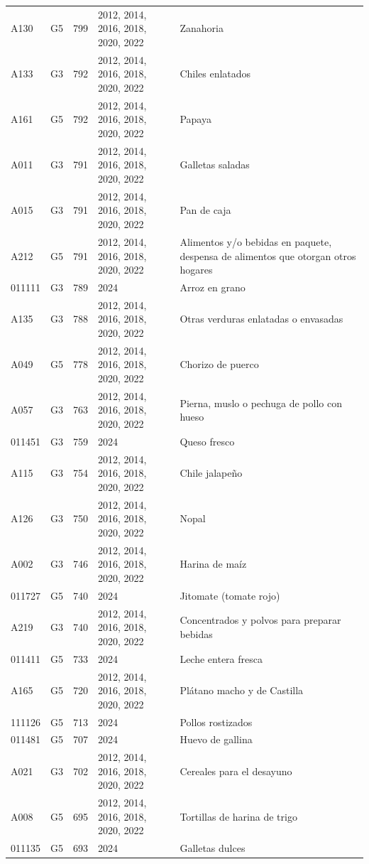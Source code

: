 \begin{table}[ht]
\begin{tabular}{llrll}
  A130 & G5 & 799 & 2012, 2014, 2016, 2018, 2020, 2022 & Zanahoria \\ 
  A133 & G3 & 792 & 2012, 2014, 2016, 2018, 2020, 2022 & Chiles enlatados \\ 
  A161 & G5 & 792 & 2012, 2014, 2016, 2018, 2020, 2022 & Papaya \\ 
  A011 & G3 & 791 & 2012, 2014, 2016, 2018, 2020, 2022 & Galletas saladas \\ 
  A015 & G3 & 791 & 2012, 2014, 2016, 2018, 2020, 2022 & Pan de caja \\ 
  A212 & G5 & 791 & 2012, 2014, 2016, 2018, 2020, 2022 & Alimentos y/o bebidas en paquete, despensa de alimentos que otorgan otros hogares \\ 
  011111 & G3 & 789 & 2024 & Arroz en grano \\ 
  A135 & G3 & 788 & 2012, 2014, 2016, 2018, 2020, 2022 & Otras verduras enlatadas o envasadas \\ 
  A049 & G5 & 778 & 2012, 2014, 2016, 2018, 2020, 2022 & Chorizo de puerco \\ 
  A057 & G3 & 763 & 2012, 2014, 2016, 2018, 2020, 2022 & Pierna, muslo o pechuga de pollo con hueso \\ 
  011451 & G3 & 759 & 2024 & Queso fresco \\ 
  A115 & G3 & 754 & 2012, 2014, 2016, 2018, 2020, 2022 & Chile jalapeño \\ 
  A126 & G3 & 750 & 2012, 2014, 2016, 2018, 2020, 2022 & Nopal \\ 
  A002 & G3 & 746 & 2012, 2014, 2016, 2018, 2020, 2022 & Harina de maíz \\ 
  011727 & G5 & 740 & 2024 & Jitomate (tomate rojo) \\ 
  A219 & G3 & 740 & 2012, 2014, 2016, 2018, 2020, 2022 & Concentrados y polvos para preparar bebidas \\ 
  011411 & G5 & 733 & 2024 & Leche entera fresca \\ 
  A165 & G5 & 720 & 2012, 2014, 2016, 2018, 2020, 2022 & Plátano macho y de Castilla \\ 
  111126 & G5 & 713 & 2024 & Pollos rostizados \\ 
  011481 & G5 & 707 & 2024 & Huevo de gallina \\ 
  A021 & G3 & 702 & 2012, 2014, 2016, 2018, 2020, 2022 & Cereales para el desayuno \\ 
  A008 & G5 & 695 & 2012, 2014, 2016, 2018, 2020, 2022 & Tortillas de harina de trigo \\ 
  011135 & G5 & 693 & 2024 & Galletas dulces \\ 

\end{tabular}
\end{table}
